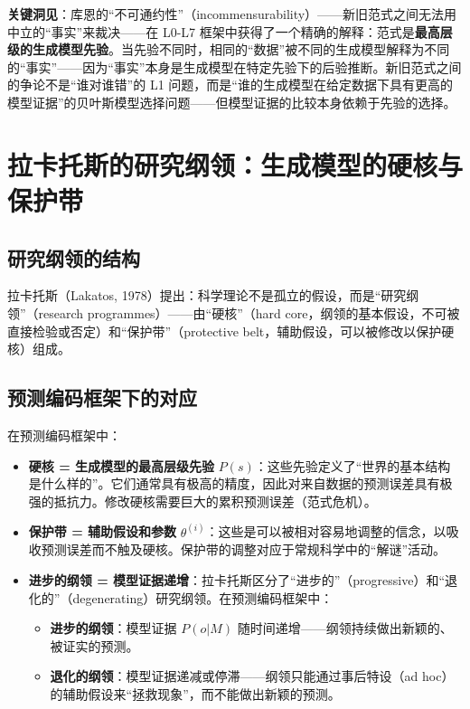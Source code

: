 \documentclass[UTF8,12pt,a4paper]{ctexart}
\begin{document}
\textbf{关键洞见}：库恩的``不可通约性''（incommensurability）——新旧范式之间无法用中立的``事实''来裁决——在 L0-L7 框架中获得了一个精确的解释：范式是\textbf{最高层级的生成模型先验}。当先验不同时，相同的``数据''被不同的生成模型解释为不同的``事实''——因为``事实''本身是生成模型在特定先验下的后验推断。新旧范式之间的争论不是``谁对谁错''的 L1 问题，而是``谁的生成模型在给定数据下具有更高的模型证据''的贝叶斯模型选择问题——但模型证据的比较本身依赖于先验的选择。

\section{拉卡托斯的研究纲领：生成模型的硬核与保护带}

\subsection{研究纲领的结构}

拉卡托斯（Lakatos, 1978）提出：科学理论不是孤立的假设，而是``研究纲领''（research programmes）——由``硬核''（hard core，纲领的基本假设，不可被直接检验或否定）和``保护带''（protective belt，辅助假设，可以被修改以保护硬核）组成。

\subsection{预测编码框架下的对应}

在预测编码框架中：

\begin{itemize}[nosep]
    \item \textbf{硬核 = 生成模型的最高层级先验} $P(s)$：这些先验定义了``世界的基本结构是什么样的''。它们通常具有极高的精度，因此对来自数据的预测误差具有极强的抵抗力。修改硬核需要巨大的累积预测误差（范式危机）。
    \item \textbf{保护带 = 辅助假设和参数} $\theta^{(i)}$：这些是可以被相对容易地调整的信念，以吸收预测误差而不触及硬核。保护带的调整对应于常规科学中的``解谜''活动。
    \item \textbf{进步的纲领 = 模型证据递增}：拉卡托斯区分了``进步的''（progressive）和``退化的''（degenerating）研究纲领。在预测编码框架中：
    \begin{itemize}[nosep]
        \item \textbf{进步的纲领}：模型证据 $P(o|M)$ 随时间递增——纲领持续做出新颖的、被证实的预测。
        \item \textbf{退化的纲领}：模型证据递减或停滞——纲领只能通过事后特设（ad hoc）的辅助假设来``拯救现象''，而不能做出新颖的预测。
    \end{itemize}
\end{itemize}
\end{document}
